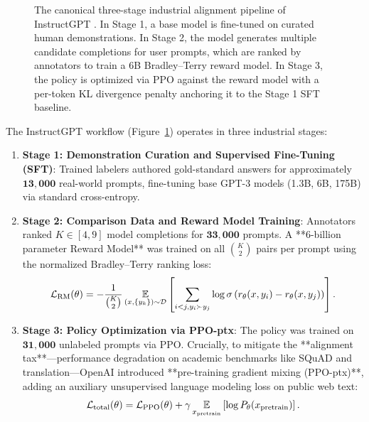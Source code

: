 \documentclass[../../../main.tex]{subfiles}
\begin{document}
\begin{figure}[t]
\caption{The canonical three-stage industrial alignment pipeline of InstructGPT \citep{ouyang2022}. In Stage 1, a base model is fine-tuned on curated human demonstrations. In Stage 2, the model generates multiple candidate completions for user prompts, which are ranked by annotators to train a 6B Bradley--Terry reward model. In Stage 3, the policy is optimized via PPO against the reward model with a per-token KL divergence penalty anchoring it to the Stage 1 SFT baseline.}
\label{fig:instructgpt_pipeline}
\end{figure}

The InstructGPT workflow (Figure~\ref{fig:instructgpt_pipeline}) operates in three industrial stages:
\begin{enumerate}
    \item \textbf{Stage 1: Demonstration Curation and Supervised Fine-Tuning (SFT)}: Trained labelers authored gold-standard answers for approximately $\mathbf{13{,}000}$ real-world prompts, fine-tuning base GPT-3 models (1.3B, 6B, 175B) via standard cross-entropy.
    \item \textbf{Stage 2: Comparison Data and Reward Model Training}: Annotators ranked $K \in [4, 9]$ model completions for $\mathbf{33{,}000}$ prompts. A **6-billion parameter Reward Model** was trained on all $\binom{K}{2}$ pairs per prompt using the normalized Bradley--Terry ranking loss:
    \begin{equation}
    \mathcal{L}_{\text{RM}}(\theta) = -\frac{1}{\binom{K}{2}} \operatorname*{\mathbb{E}}_{(x, \{y_k\}) \sim \mathcal{D}} \left[ \sum_{i < j, y_i \succ y_j} \log \sigma\left(r_\theta(x, y_i) - r_\theta(x, y_j)\right) \right].
    \end{equation}
    \item \textbf{Stage 3: Policy Optimization via PPO-ptx}: The policy was trained on $\mathbf{31{,}000}$ unlabeled prompts via PPO. Crucially, to mitigate the **alignment tax**---performance degradation on academic benchmarks like SQuAD and translation---OpenAI introduced **pre-training gradient mixing (PPO-ptx)**, adding an auxiliary unsupervised language modeling loss on public web text:
    \begin{equation}
    \mathcal{L}_{\text{total}}(\theta) = \mathcal{L}_{\text{PPO}}(\theta) + \gamma \operatorname*{\mathbb{E}}_{x_{\text{pretrain}}} \left[ \log P_\theta(x_{\text{pretrain}}) \right].
    \end{equation}
\end{enumerate}
\end{document}

